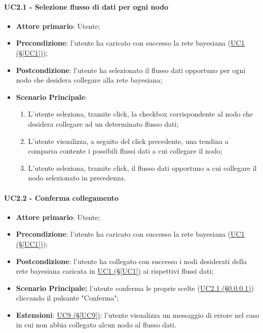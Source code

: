 \paragraph{UC2.1 - Selezione flusso di dati per ogni nodo}\label{UC2.1}
\begin{itemize}
\item \textbf{Attore primario}: Utente;
\item \textbf{Precondizione}: l'utente ha caricato con successo la rete bayesiana (\hyperref[UC1]{UC1 (§\ref*{UC1})});
\item \textbf{Postcondizione}: l'utente ha selezionato il flusso dati opportuno per ogni nodo che desidera collegare alla rete bayesiana;
\item \textbf{Scenario Principale}:
 \begin{enumerate}
 \item L'utente seleziona, tramite click, la checkbox corrispondente al nodo che desidera collegare ad un determinato flusso dati;
 \item L'utente visualizza, a seguito del click precedente, una tendina a comparsa contente i possibili flussi dati a cui collegare il nodo;
 \item L'utente seleziona, tramite click, il flusso dati opportuno a cui collegare il nodo selezionato in precedenza.
 \end{enumerate}
\end{itemize}

\paragraph{UC2.2 - Conferma collegamento}\label{UC2.2}
\begin{itemize}
\item \textbf{Attore primario}: Utente;
\item \textbf{Precondizione}: l'utente ha caricato con successo la rete bayesiana (\hyperref[UC1]{UC1 (§\ref*{UC1})});
\item \textbf{Postcondizione}: l'utente ha collegato con successo i nodi desiderati della rete bayesiana caricata in \hyperref[UC1]{UC1 (§\ref*{UC1})} ai rispettivi flussi dati;
\item \textbf{Scenario Principale:} l'utente conferma le proprie scelte (\hyperref[UC2.1]{UC2.1 (§\ref*{UC2.1})}) cliccando il pulsante "Conferma";
\item \textbf{Estensioni}: \hyperref[UC9]{UC9 (§\ref*{UC9})}: l'utente visualizza un messaggio di errore nel caso in cui non abbia collegato alcun nodo al flusso dati.
\end{itemize}
\newpage

